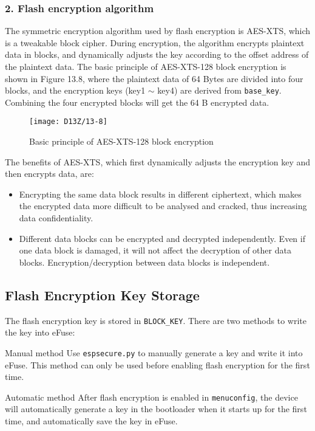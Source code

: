 \documentclass[a4paper,12pt]{book}
\begin{document}
\subsubsection{2. Flash encryption algorithm}
The symmetric encryption algorithm used by flash encryption is AES-XTS, which is a tweakable block cipher. During encryption, the algorithm encrypts plaintext data in blocks, and dynamically adjusts the key according to the offset address of the plaintext data. The basic principle of AES-XTS-128 block encryption is shown in Figure 13.8, where the plaintext data of 64 Bytes are divided into four blocks, and the encryption keys (key1 $\sim$ key4) are derived from \verb|base_key|. Combining the four encrypted blocks will get the 64 B encrypted data.

\begin{figure}[!h]
    \centering
    \texttt{[image: D13Z/13-8]}
    \caption{Basic principle of AES-XTS-128 block encryption}
\end{figure}

The benefits of AES-XTS, which first dynamically adjusts the encryption key and then encrypts data, are: 

\begin{itemize}
    \item Encrypting the same data block results in different ciphertext, which makes the encrypted data more difficult to be analysed and cracked, thus increasing data confidentiality. 
    \item Different data blocks can be encrypted and decrypted independently. Even if one data block is damaged, it will not affect the decryption of other data blocks. Encryption/decryption between data blocks is independent.
\end{itemize}

\subsection{Flash Encryption Key Storage}
The flash encryption key is stored in \verb|BLOCK_KEY|. There are two methods to write the key into eFuse: 

\begin{term}{Manual method}
    Use \verb|espsecure.py| to manually generate a key and write it into eFuse. This method can only be used before enabling flash encryption for the first time.
\end{term}

\begin{term}{Automatic method}
    After flash encryption is enabled in \verb|menuconfig|, the device will automatically generate a key in the bootloader when it starts up for the first time, and automatically save the key in eFuse.
\end{term}
\end{document}
